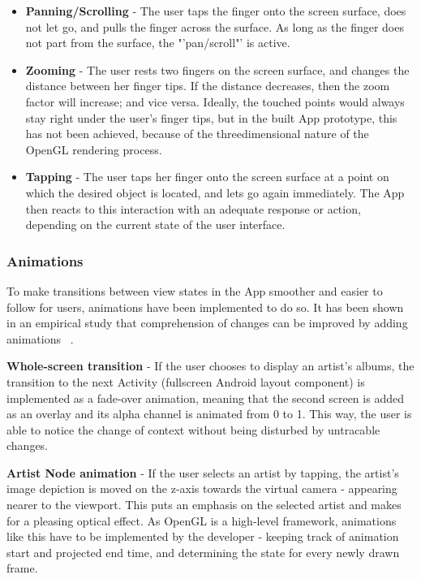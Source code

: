 \begin{itemize}
	\item \textbf{Panning/Scrolling} - The user taps the finger onto the screen surface, does not let 
	go, and pulls the finger across the surface. As long as the finger does not part from the surface, 
	the "'pan/scroll"' is active.
	\item \textbf{Zooming} - The user rests two fingers on the screen surface, and changes the distance
	between her finger tips. If the distance decreases, then the zoom factor will increase; and vice versa.
	Ideally, the touched points would always stay right under the user's finger tips, but in the built
	App prototype, this has not been achieved, because of the threedimensional nature of the OpenGL
	rendering process.
	\item \textbf{Tapping} - The user taps her finger onto the screen surface at a point on which the
	desired object is located, and lets go again immediately. The App then reacts to this interaction
	with an adequate response or action, depending on the current state of the user interface.
\end{itemize}

\subsubsection{Animations}

To make transitions between view states in the App smoother and easier to follow for users, animations have been implemented to do so. It has been shown in an empirical study that comprehension of changes can be improved by adding animations ~\cite{Schlienger:2007}.

\textbf{Whole-screen transition} - If the user chooses to display an artist's albums, the transition to the next Activity (fullscreen Android layout component) is implemented as a fade-over animation, meaning that the second screen is added as an overlay and its alpha channel is animated from 0 to 1. This way, the user is able to notice the change of context without being disturbed by untracable changes.

\textbf{Artist Node animation} - If the user selects an artist by tapping, the artist's image depiction is moved on the z-axis towards the virtual camera - appearing nearer to the viewport. This puts an emphasis on the selected artist and makes for a pleasing optical effect. As OpenGL is a high-level framework, animations like this have to be implemented by the developer - keeping track of animation start and projected end time, and determining the state for every newly drawn frame.

